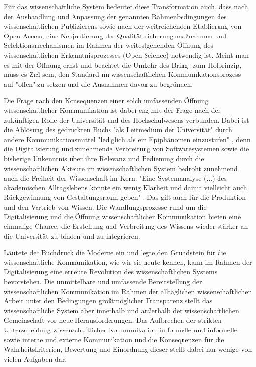 Für das wissenschaftliche System bedeutet diese Transformation auch, dass nach der Aushandlung und Anpassung der genannten Rahmenbedingungen des wissenschaftlichen Publizierens sowie nach der weitreichenden Etablierung von Open Access, eine Neujustierung der Qualitätssicherungsmaßnahmen und Selektionsmechanismen im Rahmen der weitestgehenden Öffnung des wissenschaftlichen Erkenntnisprozesses (Open Science) notwendig ist. Meint man es mit der Öffnung ernst und beachtet die Umkehr des Bring- zum Holprinzip, muss es Ziel sein, den Standard im wissenschaftlichen Kommunikationsprozess auf "offen" zu setzen und die Ausnahmen davon zu begründen.

Die Frage nach den Konsequenzen einer solch umfassenden Öffnung wissenschaftlicher Kommunikation ist dabei eng mit der Frage nach der zukünftigen Rolle der Universität und des Hochschulwesens verbunden. Dabei ist die Ablösung des gedruckten Buchs "als Leitmedium der Universität" durch andere Kommunikationsmittel "lediglich als ein Epiphänomen einzustufen" \cite{Warnke_2012}, denn die Digitalisierung und zunehmende Verbreitung von Softwaresystemen sowie die bisherige Unkenntnis über ihre Relevanz und Bedienung durch die wissenschaftlichen Akteure im wissenschaftlichen System bedroht zunehmend auch die Freiheit der Wissenschaft im Kern. "Eine Systemanalyse (...) des akademischen Alltagslebens könnte ein wenig Klarheit und damit vielleicht auch Rückgewinnung von Gestaltungsraum geben" \cite{Warnke_2012}. Das gilt auch für die Produktion und den Vertrieb von Wissen. Die Wandlungsprozesse rund um die Digitalisierung und die Öffnung wissenschaftlicher Kommunikation bieten eine einmalige Chance, die Erstellung und Verbreitung des Wissens wieder stärker an die Universität zu binden und zu integrieren.

Läutete der Buchdruck die Moderne ein und legte den Grundstein für die wissenschaftliche Kommunikation, wie wir sie heute kennen, kann im Rahmen der Digitalisierung eine erneute Revolution des wissenschaftlichen Systems bevorstehen. Die unmittelbare und umfassende Bereitstellung der wissenschaftlichen Kommunikation im Rahmen der alltäglichen wissenschaftlichen Arbeit unter den Bedingungen größtmöglicher Transparenz stellt das wissenschaftliche System aber innerhalb und außerhalb der wissenschaftlichen Gemeinschaft vor neue Herausforderungen. Das Aufbrechen der strikten Unterscheidung wissenschaftlicher Kommunikation in formelle und informelle sowie interne und externe Kommunikation und die Konsequenzen für die Wahrheitskriterien, Bewertung und Einordnung dieser stellt dabei nur wenige von vielen Aufgaben dar.

